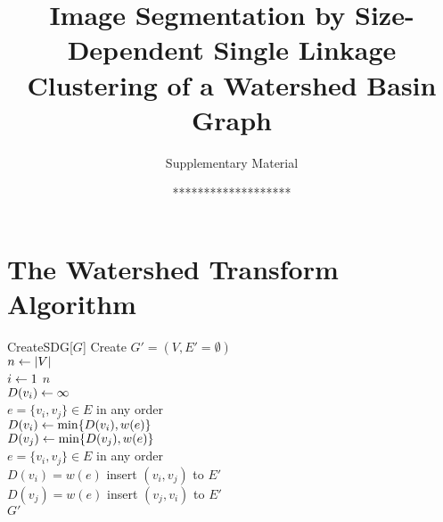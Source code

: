 \documentclass{llncs}
\begin{document}
\title{Image Segmentation by Size-Dependent Single Linkage
  Clustering of a Watershed Basin Graph}

\subtitle{Supplementary Material}

\author{{*}{*}{*}{*}{*}{*}{*}{*}{*}{*}{*}{*}{*}{*}{*}{*}{*}{*}{*}}


\institute{{*}{*}{*}{*}{*}{*}{*}{*}{*}{*}{*}\\
\texttt{{*}{*}{*}{*}{*}{*}{*}{*}{*}}\\
{*}{*}{*}{*}{*}{*}{*}{*}{*}{*}{*}\\
\texttt{{*}{*}{*}{*}{*}{*}{*}{*}{*}}}

\maketitle


\section{The Watershed Transform Algorithm}\label{sec:Introduction}

\begin{algorithm}{CreateSDG}[$G$]{
    \label{algo:createsdg}
  }
  Create $G'=(V,E'=\emptyset)$ \\
  $n \mathrel{\leftarrow} |V|$ \\
  \qfor $i \mathrel{\leftarrow} 1$ \qto $n$ \\
  \qdo $D(v_i) \mathrel{\leftarrow} \infty$ \qrof \\
  \qfor $e = \{v_i,v_j\} \in E$ in any order\\
  \qdo $D(v_i) \mathrel{\leftarrow} \min\{D(v_i),w(e)\}$ \\
  $D(v_j) \mathrel{\leftarrow} \min\{D(v_j),w(e)\}$ \qrof \\
  \qfor $e = \{v_i,v_j\} \in E$ in any order \\
  \qdo \qqif $D(v_i) = w(e)$ \qqthen insert $(v_i,v_j)$ to $E'$ \\
  \qqif $D(v_j) = w(e)$ \qqthen insert $(v_j,v_i)$ to $E'$ \qrof \\
  \qreturn $G'$
\end{algorithm}
\end{document}
